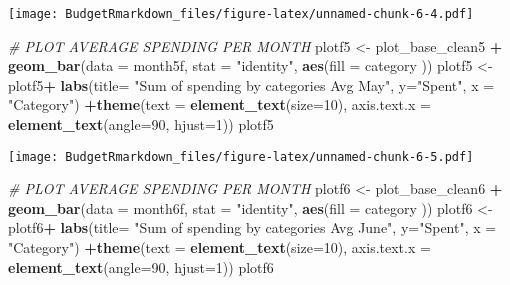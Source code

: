 \documentclass[
]{article}
\newenvironment{Shaded}{\begin{snugshade}}{\end{snugshade}}
\newcommand{\CommentTok}[1]{\textcolor[rgb]{0.56,0.35,0.01}{\textit{#1}}}
\newcommand{\DataTypeTok}[1]{\textcolor[rgb]{0.13,0.29,0.53}{#1}}
\newcommand{\DecValTok}[1]{\textcolor[rgb]{0.00,0.00,0.81}{#1}}
\newcommand{\KeywordTok}[1]{\textcolor[rgb]{0.13,0.29,0.53}{\textbf{#1}}}
\newcommand{\NormalTok}[1]{#1}
\newcommand{\OperatorTok}[1]{\textcolor[rgb]{0.81,0.36,0.00}{\textbf{#1}}}
\newcommand{\StringTok}[1]{\textcolor[rgb]{0.31,0.60,0.02}{#1}}
\begin{document}
\texttt{[image: BudgetRmarkdown\_files/figure-latex/unnamed-chunk-6-4.pdf]}

\begin{Shaded}
\begin{Highlighting}[]
 \CommentTok{# PLOT AVERAGE SPENDING PER MONTH}
\NormalTok{ plotf5 <-}\StringTok{ }\NormalTok{plot_base_clean5 }\OperatorTok{+}\StringTok{ }\KeywordTok{geom_bar}\NormalTok{(}\DataTypeTok{data =}\NormalTok{ month5f, }\DataTypeTok{stat =} \StringTok{"identity"}\NormalTok{, }\KeywordTok{aes}\NormalTok{(}\DataTypeTok{fill =}\NormalTok{ category ))  }
\NormalTok{ plotf5 <-}\StringTok{ }\NormalTok{plotf5}\OperatorTok{+}\StringTok{ }\KeywordTok{labs}\NormalTok{(}\DataTypeTok{title=} \StringTok{"Sum of spending by categories Avg May"}\NormalTok{, }\DataTypeTok{y=}\StringTok{"Spent"}\NormalTok{, }\DataTypeTok{x =} \StringTok{"Category"}\NormalTok{) }\OperatorTok{+}\KeywordTok{theme}\NormalTok{(}\DataTypeTok{text =} \KeywordTok{element_text}\NormalTok{(}\DataTypeTok{size=}\DecValTok{10}\NormalTok{), }\DataTypeTok{axis.text.x =} \KeywordTok{element_text}\NormalTok{(}\DataTypeTok{angle=}\DecValTok{90}\NormalTok{, }\DataTypeTok{hjust=}\DecValTok{1}\NormalTok{)) }
\NormalTok{ plotf5}
\end{Highlighting}
\end{Shaded}

\texttt{[image: BudgetRmarkdown\_files/figure-latex/unnamed-chunk-6-5.pdf]}

\begin{Shaded}
\begin{Highlighting}[]
 \CommentTok{# PLOT AVERAGE SPENDING PER MONTH}
\NormalTok{ plotf6 <-}\StringTok{ }\NormalTok{plot_base_clean6 }\OperatorTok{+}\StringTok{ }\KeywordTok{geom_bar}\NormalTok{(}\DataTypeTok{data =}\NormalTok{ month6f, }\DataTypeTok{stat =} \StringTok{"identity"}\NormalTok{, }\KeywordTok{aes}\NormalTok{(}\DataTypeTok{fill =}\NormalTok{ category ))  }
\NormalTok{ plotf6 <-}\StringTok{ }\NormalTok{plotf6}\OperatorTok{+}\StringTok{ }\KeywordTok{labs}\NormalTok{(}\DataTypeTok{title=} \StringTok{"Sum of spending by categories Avg June"}\NormalTok{, }\DataTypeTok{y=}\StringTok{"Spent"}\NormalTok{, }\DataTypeTok{x =} \StringTok{"Category"}\NormalTok{) }\OperatorTok{+}\KeywordTok{theme}\NormalTok{(}\DataTypeTok{text =} \KeywordTok{element_text}\NormalTok{(}\DataTypeTok{size=}\DecValTok{10}\NormalTok{), }\DataTypeTok{axis.text.x =} \KeywordTok{element_text}\NormalTok{(}\DataTypeTok{angle=}\DecValTok{90}\NormalTok{, }\DataTypeTok{hjust=}\DecValTok{1}\NormalTok{)) }
\NormalTok{ plotf6}
\end{Highlighting}
\end{Shaded}
\end{document}
